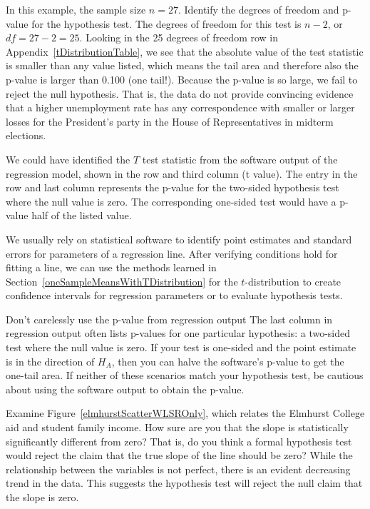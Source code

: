 \begin{example}{In this example, the sample size $n=27$. Identify the degrees of freedom and p-value for the hypothesis test.}
The degrees of freedom for this test is $n-2$, or $df = 27-2 = 25$. Looking in the 25 degrees of freedom row in Appendix~\ref{tDistributionTable}, we see that the absolute value of the test statistic is smaller than any value listed, which means the tail area and therefore also the p-value is larger than 0.100 (one tail!). Because the p-value is so large, we fail to reject the null hypothesis. That is, the data do not provide convincing evidence that a higher unemployment rate has any correspondence with smaller or larger losses for the President's party in the House of Representatives in midterm elections.
\end{example}

We could have identified the $T$ test statistic from the software output of the regression model, shown in the  row and third column (t value). The entry in the  row and last column represents the p-value for the two-sided hypothesis test where the null value is zero. The corresponding one-sided test would have a p-value half of the listed value.

\begin{termBox}{
We usually rely on statistical software to identify point estimates and standard errors for parameters of a regression line. After verifying conditions hold for fitting a line, we can use the methods learned in Section~\ref{oneSampleMeansWithTDistribution} for the $t$-distribution to create confidence intervals for regression parameters or to evaluate hypothesis tests.}
\end{termBox}

\begin{caution}{Don't carelessly use the p-value from regression output}
{The last column in regression output often lists p-values for one particular hypothesis: a two-sided test where the null value is zero. If your test is one-sided and the point estimate is in the direction of $H_A$, then you can halve the software's p-value to get the one-tail area. If neither of these scenarios match your hypothesis test, be cautious about using the software output to obtain the p-value.}
\end{caution}

\begin{example}{Examine Figure~\vref{elmhurstScatterWLSROnly}, which relates the Elmhurst College aid and student family income. How sure are you that the slope is statistically significantly different from zero? That is, do you think a formal hypothesis test would reject the claim that the true slope of the line should be zero?} \label{overallAidIncomeInformalAssessmentOfRegressionLineSlope}
While the relationship between the variables is not perfect, there is an evident decreasing trend in the data. This suggests the hypothesis test will reject the null claim that the slope is zero.
\end{example}

